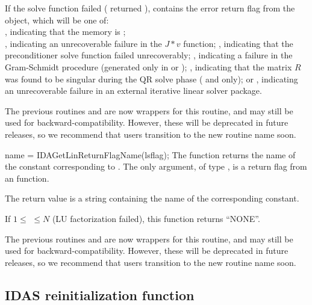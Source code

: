 {{  If the {\idals} solve function failed ( returned
  ),  contains the error return flag from
  the {\sunlinsol} object, which will be one of: \\ \noindent 
  , indicating that the {\sunlinsol} memory is ;
  \\ \noindent {}, indicating an
  unrecoverable failure in the $J*v$ function;
  , indicating that the preconditioner solve
  function  failed unrecoverably;
  , indicating a failure in the Gram-Schmidt
  procedure (generated only in {\spgmr} or {\spfgmr});
  , indicating that the matrix $R$ was found to be
  singular during the QR solve phase ({\spgmr} and {\spfgmr} only); or
  , indicating an unrecoverable
  failure in an external iterative linear solver package.

  The previous routines  and
   are now wrappers for this routine, and may
  still be used for backward-compatibility.  However, these will be
  deprecated in future releases, so we recommend that users transition
  to the new routine name soon.
}
{
  name = IDAGetLinReturnFlagName(lsflag);
}
{
  The function  returns the
  name of the {\ida} constant corresponding to .
}
{
  The only argument, of type , is a return flag from an
  {\idals} function. 
}
{
  The return value is a string containing the name of the
  corresponding constant.
  
  If $1 \leq $  $ \leq N$ (LU factorization failed), this
  function returns ``NONE''.
}
{
  The previous routines  and
   are now wrappers for this routine, and may
  still be used for backward-compatibility.  However, these will be
  deprecated in future releases, so we recommend that users transition
  to the new routine name soon.
}

\subsection{IDAS reinitialization function}\label{sss:idareinit}

}
